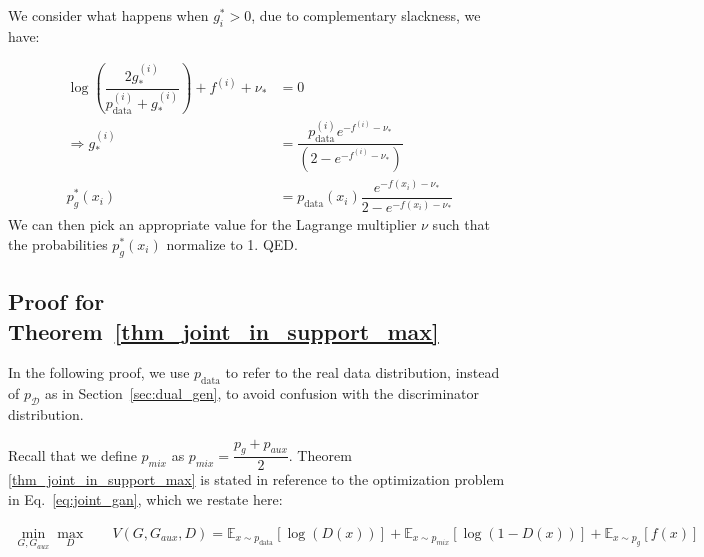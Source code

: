 We consider what happens when $g^*_i > 0$, due to complementary slackness, we have: 

\begin{align}
    \log \left( \dfrac{ 2g_*^{(i)} } { p_{\text{data} }^{(i)} + g_*^{(i)} } \right) + f^{ (i) } + \nu_* & = 0 \\ 
     \Longrightarrow g_*^{(i)} & = \dfrac{ p_{\text{data} }^{(i)}e^{-  f^{ (i) } - \nu_* } }{ ( 2 - e^{-  f^{ (i) } - \nu_* } ) } \\
     p^*_g(x_i) & = p_{\text{data} } (x_i) \dfrac{ e^{- f (x_i)  - \nu_* } } { 2 - e^{-  f(x_i)  - \nu_* } }
\end{align}
We can then pick an appropriate value for the Lagrange multiplier $\nu$ such that the probabilities $p^*_g(x_i)$ normalize to 1. QED.


\subsection{Proof for Theorem~\ref{thm_joint_in_support_max} }


In the following proof, we use $p_{\text{data}}$ to refer to the real data distribution, instead of $p_\mathcal{D}$ as in Section~\ref{sec:dual_gen}, to avoid confusion with the discriminator distribution.

Recall that we define $p_{mix}$ as $p_{mix} = \dfrac{ p_g + p_{aux} }{ 2 }$. Theorem \ref{thm_joint_in_support_max} is stated in reference to the optimization problem in Eq.~\ref{eq:joint_gan}, which we restate here:

\begin{align}
    \min_{G, G_{aux} } \max_{D} \quad & V(G, G_{aux}, D) = \mathbb{E}_{ x \sim p_{\text{data}} } [\log(D(x))] + \mathbb{E}_{ x \sim p_{mix} } [ \log(1-D(x))]  + \mathbb{E}_{ x \sim p_g } [ f ( x ) ] \label{eq:joint_gan_explicit_constraint_obj} 
\end{align}

